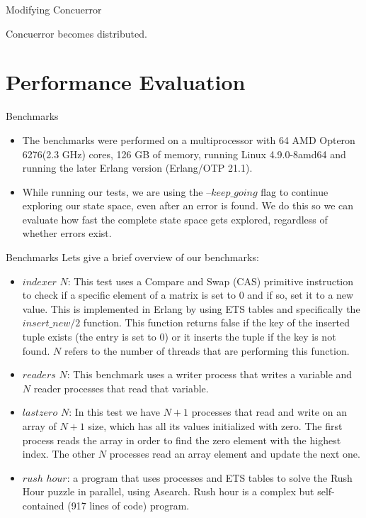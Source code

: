 \documentclass[9pt]{beamer}
\begin{document}
\begin{frame} {Modifying Concuerror}

Concuerror becomes distributed.

\end{frame}

\section{Performance Evaluation}



\begin{frame}{Benchmarks}

\begin{itemize}
\item The benchmarks were performed on a multiprocessor with 64 AMD Opteron 6276(2.3 GHz) cores, 126 GB of memory, running
Linux 4.9.0-8amd64 and running the later Erlang version (Erlang/OTP 21.1). 
\item While running our tests, we are using the
--$keep\_going$ flag to continue exploring our state space, even after an error is found. We do this so we can evaluate
how fast the complete state space gets explored, regardless of whether errors exist.
\end{itemize}

\end{frame}


\begin{frame} {Benchmarks}
Lets give a brief overview of our benchmarks:

\begin{itemize}
    \item $indexer$ $N$: This test uses a Compare and Swap (CAS) primitive instruction to check if a specific element of
    a matrix is set to 0 and if so, set it to a new value. This is implemented in Erlang by using ETS tables and specifically
    the $insert\_new/2$ function. This function returns false if the key of the inserted tuple exists (the entry is set to 0)
    or it inserts the tuple if the key is not found. $N$ refers to the number of threads that are performing this function.
    \item $readers$ $N$: This benchmark uses a writer process that writes a variable and $N$ reader processes that read that variable.
    \item $lastzero$ $N$: In this test we have $N+1$ processes that read and write on an array of $N+1$ size, which has all its 
    values initialized with zero. The first process reads the array in order to find the zero element with the highest
    index. The other $N$ processes read an array element and update the next one.
    \item $rush$ $hour$: a program that uses processes and
    ETS tables to solve the Rush Hour puzzle in parallel, using A\textasteriskcentered  search. Rush hour is a complex but self-contained (917 lines of code) program.
\end{itemize}

\end{frame}
\end{document}
